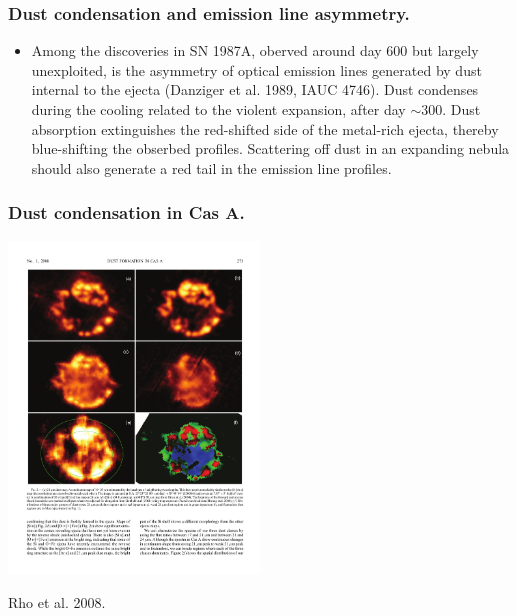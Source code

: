 \begin{frame}\frametitle{Dust condensation and emission line asymmetry.}

\begin{itemize}
\item Among the discoveries in SN 1987A, oberved around day 600 but
  largely unexploited, is the asymmetry of optical emission lines
  generated by dust internal to the ejecta (Danziger et al. 1989, IAUC
  4746).  Dust condenses during the cooling related to the violent
  expansion, after day $\sim 300$. Dust absorption extinguishes the
  red-shifted side of the metal-rich ejecta, thereby blue-shifting the
  obserbed profiles. Scattering off dust in an expanding nebula should
  also generate a red tail in the emission line profiles.

%
%
%
\end{itemize}


\end{frame}



\begin{frame}\frametitle{Dust condensation in Cas A.}



\begin{center}
\includegraphics[width=0.5\textwidth,height=!]{./D/rho_etal_fig2.pdf}
\end{center}

Rho et al. 2008. 

\end{frame}





